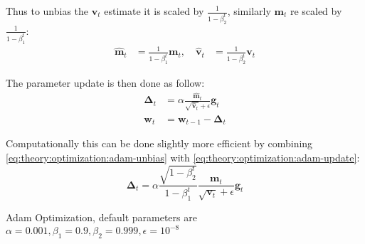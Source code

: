 Thus to unbias the $\mathbf{v}_t$ estimate it is scaled by $\frac{1}{1 - \beta_2^t}$, similarly $\mathbf{m}_t$ re scaled by $\frac{1}{1 - \beta_1^t}$:
\begin{equation}
\begin{aligned}
\hat{\mathbf{m}}_t &= \frac{1}{1 - \beta_1^t} \mathbf{m}_t, \quad \hat{\mathbf{v}}_t &= \frac{1}{1 - \beta_2^t} \mathbf{v}_t
\end{aligned}
\label{eq:theory:optimization:adam-unbias}
\end{equation}

The parameter update is then done as follow:
\begin{equation}
\begin{aligned}
{\boldsymbol\Delta}_t &= \alpha \frac{\hat{\mathbf{m}}_t}{\sqrt{\hat{\mathbf{v}}_t} + \epsilon} \mathbf{g}_t \\
\mathbf{w}_t &= \mathbf{w}_{t-1} - {\boldsymbol\Delta}_t
\end{aligned}
\label{eq:theory:optimization:adam-update}
\end{equation}

Computationally this can be done slightly more efficient by combining \eqref{eq:theory:optimization:adam-unbias} with \eqref{eq:theory:optimization:adam-update}:
\begin{equation}
{\boldsymbol\Delta}_t = \alpha \frac{\sqrt{1 - \beta_2^t}}{1 - \beta_1^t} \frac{\mathbf{m}_t}{\sqrt{\mathbf{v}_t} + \epsilon} \mathbf{g}_t
\end{equation}


\begin{algorithm}[H]
  \caption{Adam Optimization, default parameters are $\alpha=0.001, \beta_1=0.9, \beta_2=0.999, \epsilon=10^{-8}$}
  \begin{algorithmic}[1]
      \Repeat
      \State {}
    \EndFunction
  \end{algorithmic}
  \label{alg:theory:semi-supervised:nmt}
\end{algorithm}

